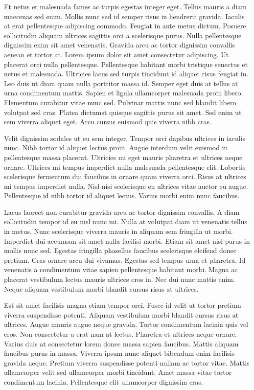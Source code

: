 \documentclass[11pt,a4paper]{article}
\begin{document}
Et netus et malesuada fames ac turpis egestas integer eget. Tellus mauris a diam maecenas sed enim. Mollis nunc sed id semper risus in hendrerit gravida. Iaculis at erat pellentesque adipiscing commodo. Feugiat in ante metus dictum. Posuere sollicitudin aliquam ultrices sagittis orci a scelerisque purus. Nulla pellentesque dignissim enim sit amet venenatis. Gravida arcu ac tortor dignissim convallis aenean et tortor at. Lorem ipsum dolor sit amet consectetur adipiscing. Ut placerat orci nulla pellentesque. Pellentesque habitant morbi tristique senectus et netus et malesuada. Ultricies lacus sed turpis tincidunt id aliquet risus feugiat in. Leo duis ut diam quam nulla porttitor massa id. Semper eget duis at tellus at urna condimentum mattis. Sapien et ligula ullamcorper malesuada proin libero. Elementum curabitur vitae nunc sed. Pulvinar mattis nunc sed blandit libero volutpat sed cras. Platea dictumst quisque sagittis purus sit amet. Sed enim ut sem viverra aliquet eget. Arcu cursus euismod quis viverra nibh cras.

Velit dignissim sodales ut eu sem integer. Tempor orci dapibus ultrices in iaculis nunc. Nibh tortor id aliquet lectus proin. Augue interdum velit euismod in pellentesque massa placerat. Ultricies mi eget mauris pharetra et ultrices neque ornare. Ultrices mi tempus imperdiet nulla malesuada pellentesque elit. Lobortis scelerisque fermentum dui faucibus in ornare quam viverra orci. Risus at ultrices mi tempus imperdiet nulla. Nisl nisi scelerisque eu ultrices vitae auctor eu augue. Pellentesque id nibh tortor id aliquet lectus. Varius morbi enim nunc faucibus.

Lacus laoreet non curabitur gravida arcu ac tortor dignissim convallis. A diam sollicitudin tempor id eu nisl nunc mi. Nulla at volutpat diam ut venenatis tellus in metus. Nunc scelerisque viverra mauris in aliquam sem fringilla ut morbi. Imperdiet dui accumsan sit amet nulla facilisi morbi. Etiam sit amet nisl purus in mollis nunc sed. Egestas fringilla phasellus faucibus scelerisque eleifend donec pretium. Cras ornare arcu dui vivamus. Egestas sed tempus urna et pharetra. Id venenatis a condimentum vitae sapien pellentesque habitant morbi. Magna ac placerat vestibulum lectus mauris ultrices eros in. Nec dui nunc mattis enim. Neque aliquam vestibulum morbi blandit cursus risus at ultrices.

Est sit amet facilisis magna etiam tempor orci. Fusce id velit ut tortor pretium viverra suspendisse potenti. Aliquam vestibulum morbi blandit cursus risus at ultrices. Augue mauris augue neque gravida. Tortor condimentum lacinia quis vel eros. Non consectetur a erat nam at lectus. Pharetra et ultrices neque ornare. Varius duis at consectetur lorem donec massa sapien faucibus. Mattis aliquam faucibus purus in massa. Viverra ipsum nunc aliquet bibendum enim facilisis gravida neque. Pretium viverra suspendisse potenti nullam ac tortor vitae. Mattis ullamcorper velit sed ullamcorper morbi tincidunt. Amet massa vitae tortor condimentum lacinia. Pellentesque elit ullamcorper dignissim cras.
\end{document}
